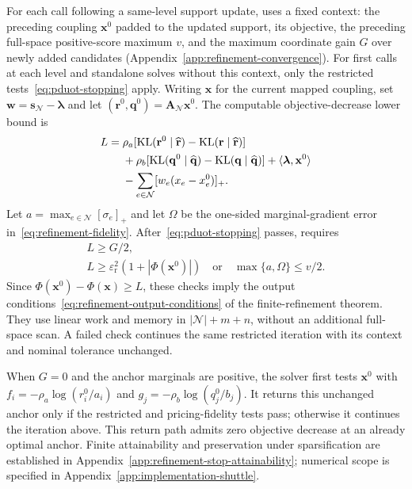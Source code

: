 For each call following a same-level support update, \checkstop uses a fixed context: the preceding coupling $\mathbf x^0$ padded to the updated support, its objective, the preceding full-space positive-score maximum $v$, and the maximum coordinate gain $G$ over newly added candidates (Appendix~\ref{app:refinement-convergence}).
For first calls at each level and standalone solves without this context, only the restricted tests~\eqref{eq:pduot-stopping} apply.
Writing $\mathbf x$ for the current mapped coupling, set $\mathbf w=\mathbf s_{\mathcal N}-\boldsymbol\lambda$ and let $(\mathbf r^0,\mathbf q^0)=\mathbf A_{\mathcal N}\mathbf x^0$.
The computable objective-decrease lower bound is
\begin{equation}
\label{eq:refinement-positive-part-bound}
\begin{aligned}
L={}&\rho_a[\operatorname{KL}(\mathbf r^0\mid\widehat{\mathbf r})-\operatorname{KL}(\mathbf r\mid\widehat{\mathbf r})]\\
&+\rho_b[\operatorname{KL}(\mathbf q^0\mid\widehat{\mathbf q})-\operatorname{KL}(\mathbf q\mid\widehat{\mathbf q})]+\langle\boldsymbol\lambda,\mathbf x^0\rangle\\
&-\sum_{e\in\mathcal N}[w_e(x_e-x_e^0)]_+.
\end{aligned}
\end{equation}
Let $a=\max_{e\in\mathcal N}[\sigma_e]_+$ and let $\Omega$ be the one-sided marginal-gradient error in~\eqref{eq:refinement-fidelity}.
After~\eqref{eq:pduot-stopping} passes, \checkstop requires
\begin{equation}
\label{eq:refinement-implemented-gate}
\begin{gathered}
L\geq G/2,\\
L\geq\varepsilon_{\mathrm r}^2(1+|\Phi(\mathbf x^0)|)
\quad\text{or}\quad\max\{a,\Omega\}\leq v/2.
\end{gathered}
\end{equation}
Since $\Phi(\mathbf x^0)-\Phi(\mathbf x)\geq L$, these checks imply the output conditions~\eqref{eq:refinement-output-conditions} of the finite-refinement theorem.
They use linear work and memory in $|\mathcal N|+m+n$, without an additional full-space scan.
A failed check continues the same restricted iteration with its context and nominal tolerance unchanged.

When $G=0$ and the anchor marginals are positive, the solver first tests $\mathbf x^0$ with $f_i=-\rho_a\log(r_i^0/a_i)$ and $g_j=-\rho_b\log(q_j^0/b_j)$.
It returns this unchanged anchor only if the restricted and pricing-fidelity tests pass; otherwise it continues the iteration above.
This return path admits zero objective decrease at an already optimal anchor.
Finite attainability and preservation under sparsification are established in Appendix~\ref{app:refinement-stop-attainability}; numerical scope is specified in Appendix~\ref{app:implementation-shuttle}.


